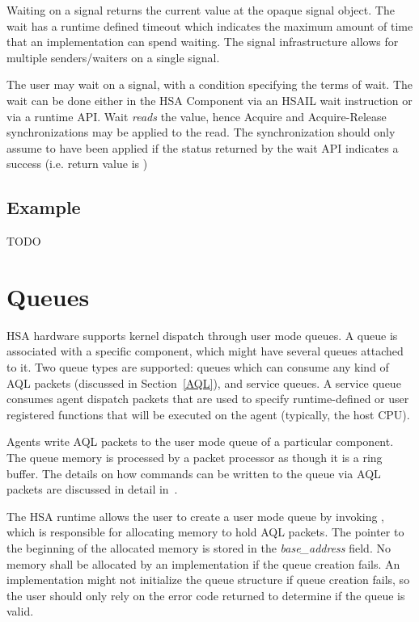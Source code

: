 \documentclass[draft]{book}
\newcommand{\reffld}[1]{\textit{#1}}
\begin{document}
Waiting on a signal returns the current value at the opaque signal object. The
wait has a runtime defined timeout which indicates the maximum amount of time
that an implementation can spend waiting. The signal infrastructure allows for
multiple senders/waiters on a single signal.

The user may wait on a signal, with a condition specifying the terms of
wait. The wait can be done either in the HSA Component via an HSAIL wait
instruction or via a runtime API. Wait \emph{reads} the value, hence Acquire and
Acquire-Release synchronizations may be applied to the read. The synchronization
should only assume to have been applied if the status returned by the wait API
indicates a success (i.e. return value is )

\hypertarget{signal-example}{} \subsection{Example}
TODO

\hypertarget{architected-queue}{} \section{Queues} \label{architected-queue}
HSA hardware supports kernel dispatch through user mode queues. A queue is
associated with a specific component, which might have several queues attached
to it. Two queue types are supported: queues which can consume any kind of AQL
packets (discussed in Section~\ref{AQL}), and service queues. A service queue
consumes agent dispatch packets that are used to specify runtime-defined or user
registered functions that will be executed on the agent (typically, the host
CPU).

Agents write AQL packets to the user mode queue of a particular component. The
queue memory is processed by a packet processor as though it is a ring
buffer. The details on how commands can be written to the queue via AQL packets
are discussed in detail in~\cite{sar}.

The HSA runtime allows the user to create a user mode queue by invoking
, which is responsible for allocating memory to hold
AQL packets. The pointer to the beginning of the allocated memory is stored in
the \reffld{base_address} field. No memory shall be allocated by an
implementation if the queue creation fails. An implementation might not
initialize the queue structure if queue creation fails, so the user should only
rely on the error code returned to determine if the queue is valid.
\end{document}
